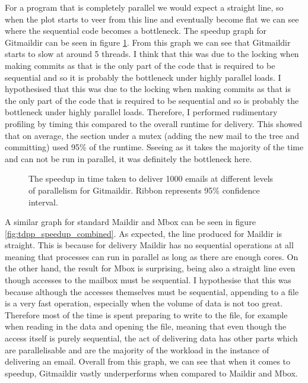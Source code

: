 For a program that is completely parallel we would expect a straight line, so when the plot starts to veer from this line and eventually become flat we can see where the sequential code becomes a bottleneck. The speedup graph for Gitmaildir can be seen in figure \ref{fig:tdpp_speedup}. From this graph we can see that Gitmaildir starts to slow at around 5 threads. I think that this was due to the locking when making commits as that is the only part of the code that is required to be sequential and so it is probably the bottleneck under highly parallel loads.
I hypothesised that this was due to the locking when making commits as that is the only part of the code that is required to be sequential and so is probably the bottleneck under highly parallel loads. Therefore, I performed rudimentary profiling by timing this compared to the overall runtime for delivery. This showed that on average, the section under a mutex (adding the new mail to the tree and committing) used 95\% of the runtime. Sseeing as it takes the majority of the time and can not be run in parallel, it was definitely the bottleneck here.

\begin{figure}[h]
    \centering
    
    \caption{The speedup in time taken to deliver 1000 emails at different levels of parallelism for Gitmaildir. Ribbon represents 95\% confidence interval.}
    \label{fig:tdpp_speedup}
\end{figure}

A similar graph for standard Maildir and Mbox can be seen in figure \ref{fig:tdpp_speedup_combined}. As expected, the line produced for Maildir is straight. This is because for delivery Maildir has no sequential operations at all meaning that processes can run in parallel as long as there are enough cores. On the other hand, the result for Mbox is surprising, being also a straight line even though accesses to the mailbox must be sequential. I hypothesise that this was because although the accesses themselves must be sequential, appending to a file is a very fast operation, especially when the volume of data is not too great. Therefore most of the time is spent preparing to write to the file, for example when reading in the data and opening the file, meaning that even though the access itself is purely sequential, the act of delivering data has other parts which are parallelisable and are the majority of the workload in the instance of delivering an email. Overall from this graph, we can see that when it comes to speedup, Gitmaildir vastly underperforms when compared to Maildir and Mbox.

